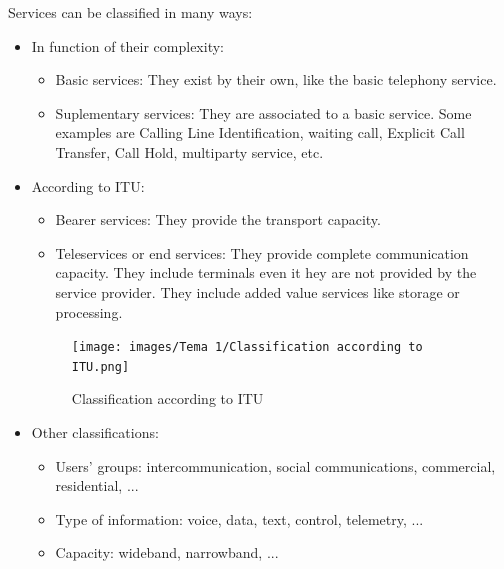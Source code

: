\documentclass[../main.tex]{subfiles}
\begin{document}
Services can be classified in many ways:

\begin{itemize}
	\item {
		In function of their complexity:
		\begin{itemize}
			\item Basic services: They exist by their own, like the basic telephony service.
			\item Suplementary services: They are associated to a basic service. Some examples are Calling Line Identification, waiting call, Explicit Call Transfer, Call Hold, multiparty service, etc.
		\end{itemize}
	}
	\item {
		According to ITU:
		\begin{itemize}
			\item Bearer services: They provide the transport capacity.
			\item Teleservices or end services: They provide complete communication capacity. They include terminals even it hey are not provided by the service provider. They include added value services like storage or processing.
		\end{itemize}
		\begin{figure}[H]
			\centering
			\texttt{[image: images/Tema 1/Classification according to ITU.png]}
			\caption{
				\label{fig:unit1_according}
				Classification according to ITU
			}
		\end{figure}
	}
	\item {
		Other classifications:

		\begin{itemize}
			\item Users' groups: intercommunication, social communications, commercial, residential, ...
			\item Type of information: voice, data, text, control, telemetry, ...
			\item {
				Capacity: wideband, narrowband, ...

}
\end{itemize}}
\end{itemize}
\end{document}
